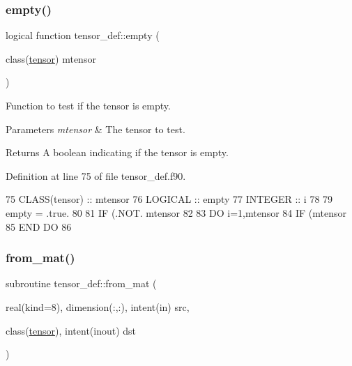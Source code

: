 \subsubsection{\texorpdfstring{empty()}{empty()}}
{\footnotesize\ttfamily logical function tensor\+\_\+def\+::empty (\begin{DoxyParamCaption}\item[{class(\hyperlink{structtensor__def_1_1tensor}{tensor})}]{mtensor }\end{DoxyParamCaption})\hspace{0.3cm}{\ttfamily [private]}}



Function to test if the tensor is empty. 


\begin{DoxyParams}{Parameters}
{\em mtensor} & The tensor to test. \\
\hline
\end{DoxyParams}
\begin{DoxyReturn}{Returns}
A boolean indicating if the tensor is empty. 
\end{DoxyReturn}


Definition at line 75 of file tensor\+\_\+def.\+f90.


\begin{DoxyCode}
75     \textcolor{keywordtype}{CLASS}(tensor) :: mtensor
76     \textcolor{keywordtype}{LOGICAL} :: empty
77     \textcolor{keywordtype}{INTEGER} :: i
78 
79     empty = .true.
80 
81     \textcolor{keywordflow}{IF} (.NOT. mtensor%
82 
83     \textcolor{keywordflow}{DO} i=1,mtensor%
84       \textcolor{keywordflow}{IF} (mtensor%
85 \textcolor{keywordflow}{    END DO}
86 
\end{DoxyCode}
\mbox{\label{namespacetensor__def_ac4dacee1ea274a06f049f6133edaaf30}} 
\subsubsection{\texorpdfstring{from\+\_\+mat()}{from\_mat()}}
{\footnotesize\ttfamily subroutine tensor\+\_\+def\+::from\+\_\+mat (\begin{DoxyParamCaption}\item[{real(kind=8), dimension(\+:,\+:), intent(in)}]{src,  }\item[{class(\hyperlink{structtensor__def_1_1tensor}{tensor}), intent(inout)}]{dst }\end{DoxyParamCaption})\hspace{0.3cm}{\ttfamily [private]}}



